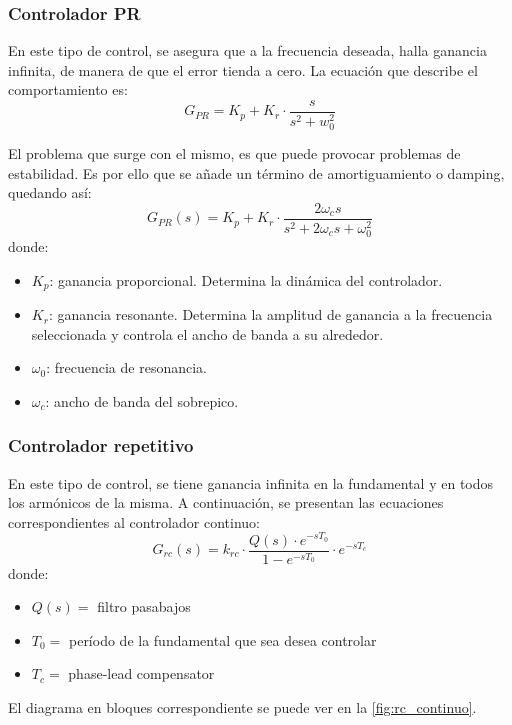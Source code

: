 \documentclass[titlepage, 12pt]{article}
\begin{document}
\subsubsection{Controlador PR}
En este tipo de control, se asegura que a la frecuencia deseada, halla ganancia infinita, de manera de que el error tienda a cero. La ecuación que describe el comportamiento es:
\[
    G_{PR} = K_p + K_r \cdot \frac{s}{s^2 + w_0^2}
\]

El problema que surge con el mismo, es que puede provocar problemas de estabilidad. Es por ello que se añade un término de amortiguamiento o damping, quedando así:
\[
    G_{PR}(s) = K_p + K_r \cdot \frac{2 \omega_c s}{s^2 + 2\omega_c s + \omega_0^2}
\]
donde:
    \begin{itemize}
        \item $K_p$: ganancia proporcional. Determina la dinámica del controlador.
        \item $K_r$: ganancia resonante. Determina la amplitud de ganancia a la frecuencia seleccionada y controla el ancho de banda a su alrededor.
        \item $\omega_0$: frecuencia de resonancia.
        \item $\omega_c$: ancho de banda del sobrepico.
    \end{itemize}

\subsubsection{Controlador repetitivo}
En este tipo de control, se tiene ganancia infinita en la fundamental y en todos los armónicos de la misma. A continuación, se presentan las ecuaciones correspondientes al controlador continuo:
\[
    G_{rc}(s) = k_{rc} \cdot \frac{Q(s) \cdot e^{-sT_0}}{1-e^{-sT_0}} \cdot e^{-sT_c}
\]
donde:
    \begin{itemize}
        \item $Q(s)=$ filtro pasabajos
        \item $T_0=$ período de la fundamental que sea desea controlar
        \item $T_c=$ phase-lead compensator
    \end{itemize}
    
El diagrama en bloques correspondiente se puede ver en la \autoref{fig:rc_continuo}.
    
\end{document}
